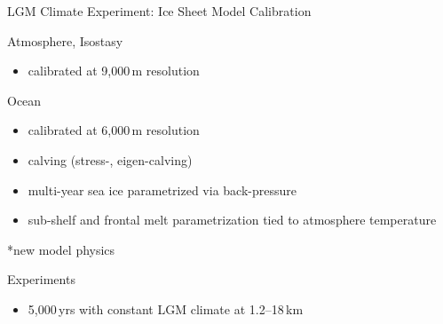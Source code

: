\documentclass[hide notes,intlimits]{beamer}
\begin{document}
{
%
} 


\begin{frame}{LGM Climate Experiment: Ice Sheet Model Calibration}
  \begin{block}{Atmosphere, Isostasy}
    \begin{itemize}
    \item calibrated at 9,000\,m resolution
    \end{itemize}
  \end{block}
  \begin{block}{Ocean}
    \begin{itemize}
    \item calibrated at 6,000\,m resolution
    \item calving (\alert{stress}-, eigen-calving)
    \item \alert{multi-year sea ice parametrized via back-pressure}
    \item \alert{sub-shelf and frontal melt} parametrization tied to atmosphere temperature
    \end{itemize}
  \end{block}
    \alert{*new model physics}
  \begin{block}{Experiments}
    \begin{itemize}
    \item 5,000\,yrs with constant LGM climate at 1.2--18\,km
    \end{itemize}
  \end{block}
\end{frame}
\end{document}
